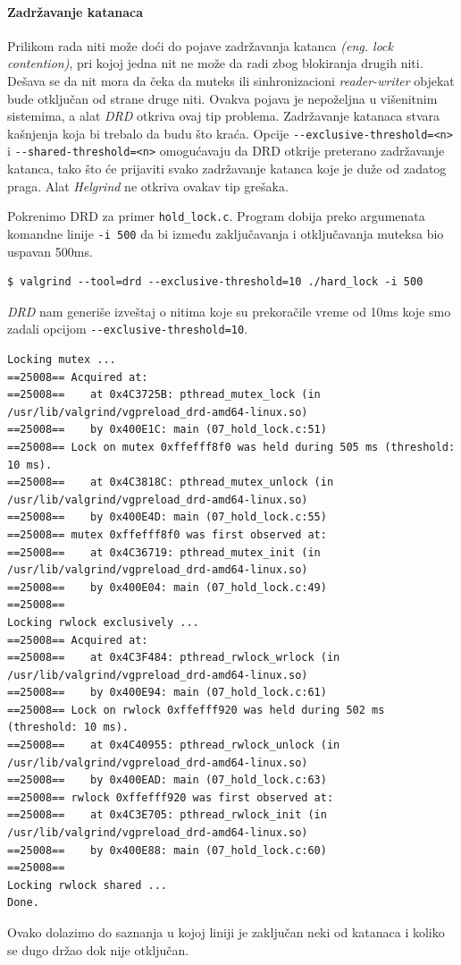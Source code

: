 \paragraph{Zadržavanje katanaca}\label{zadrux17eavanje-katanaca}

Prilikom rada niti može doći do pojave zadržavanja katanca \emph{(eng. lock contention)}, pri kojoj jedna nit ne može da radi zbog blokiranja drugih niti. Dešava se da nit mora da čeka da muteks ili sinhronizacioni \emph{reader-writer} objekat bude otključan od strane druge niti. Ovakva pojava je nepoželjna u višenitnim sistemima, a alat \emph{DRD} otkriva ovaj tip problema. Zadržavanje katanaca stvara kašnjenja koja bi trebalo da budu što kraća. Opcije \texttt{-{}-exclusive-threshold=\textless{}n\textgreater{}} i \texttt{-{}-shared-threshold=\textless{}n\textgreater{}} omogućavaju da DRD otkrije preterano zadržavanje katanca, tako što će prijaviti svako zadržavanje katanca koje je duže od zadatog praga. Alat \emph{Helgrind} ne otkriva ovakav tip grešaka.

Pokrenimo DRD za primer \texttt{hold\_lock.c}. Program dobija preko argumenata komandne linije \texttt{-i\ 500} da bi između zaključavanja i otključavanja muteksa bio uspavan 500ms.

\begin{verbatim}
$ valgrind --tool=drd --exclusive-threshold=10 ./hard_lock -i 500
\end{verbatim}

\emph{DRD} nam generiše izveštaj o nitima koje su prekoračile vreme od 10ms koje smo zadali opcijom \texttt{-{}-exclusive-threshold=10}.

\begin{verbatim}
Locking mutex ...
==25008== Acquired at:
==25008==    at 0x4C3725B: pthread_mutex_lock (in /usr/lib/valgrind/vgpreload_drd-amd64-linux.so)
==25008==    by 0x400E1C: main (07_hold_lock.c:51)
==25008== Lock on mutex 0xffefff8f0 was held during 505 ms (threshold: 10 ms).
==25008==    at 0x4C3818C: pthread_mutex_unlock (in /usr/lib/valgrind/vgpreload_drd-amd64-linux.so)
==25008==    by 0x400E4D: main (07_hold_lock.c:55)
==25008== mutex 0xffefff8f0 was first observed at:
==25008==    at 0x4C36719: pthread_mutex_init (in /usr/lib/valgrind/vgpreload_drd-amd64-linux.so)
==25008==    by 0x400E04: main (07_hold_lock.c:49)
==25008==
Locking rwlock exclusively ...
==25008== Acquired at:
==25008==    at 0x4C3F484: pthread_rwlock_wrlock (in /usr/lib/valgrind/vgpreload_drd-amd64-linux.so)
==25008==    by 0x400E94: main (07_hold_lock.c:61)
==25008== Lock on rwlock 0xffefff920 was held during 502 ms (threshold: 10 ms).
==25008==    at 0x4C40955: pthread_rwlock_unlock (in /usr/lib/valgrind/vgpreload_drd-amd64-linux.so)
==25008==    by 0x400EAD: main (07_hold_lock.c:63)
==25008== rwlock 0xffefff920 was first observed at:
==25008==    at 0x4C3E705: pthread_rwlock_init (in /usr/lib/valgrind/vgpreload_drd-amd64-linux.so)
==25008==    by 0x400E88: main (07_hold_lock.c:60)
==25008==
Locking rwlock shared ...
Done.
\end{verbatim}

Ovako dolazimo do saznanja u kojoj liniji je zaključan neki od katanaca i koliko se dugo držao dok nije otključan.
